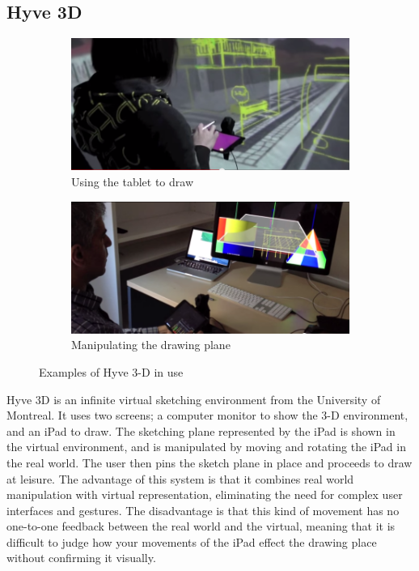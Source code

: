 \documentclass[12pt]{report}
\begin{document}
\subsection{Hyve 3D}

\begin{figure}

\begin{subfigure}{\textwidth}
\includegraphics[width=0.9\linewidth]{Hyve3D1}
\caption{Using the tablet to draw}
\end{subfigure}
\begin{subfigure}{\textwidth}
\includegraphics[width=0.9\linewidth]{Hyve3D2}
\caption{Manipulating the drawing plane}
\end{subfigure}

\caption{Examples of Hyve 3-D in use}
\end{figure}

Hyve 3D is an infinite virtual sketching environment from the University of Montreal. It uses two screens; a computer monitor to show the 3-D environment, and an iPad to draw. The sketching plane represented by the iPad is shown in the virtual environment, and is manipulated by moving and rotating the iPad in the real world. The user then pins the sketch plane in place and proceeds to draw at leisure. The advantage of this system is that it combines real world manipulation with virtual representation, eliminating the need for complex user interfaces and gestures. The disadvantage is that this kind of movement has no one-to-one feedback between the real world and the virtual, meaning that it is difficult to judge how your movements of the iPad effect the drawing place without confirming it visually.
\end{document}
